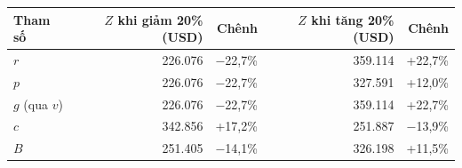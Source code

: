 \begin{tabular}{lrrrr}
\toprule
Tham số & $Z$ khi giảm 20\% (USD) & Chênh & $Z$ khi tăng 20\% (USD) & Chênh \\
\midrule
$r$ & 226.076 & $-$22,7\% & 359.114 & +22,7\% \\
$p$ & 226.076 & $-$22,7\% & 327.591 & +12,0\% \\
$g$ (qua $v$) & 226.076 & $-$22,7\% & 359.114 & +22,7\% \\
$c$ & 342.856 & +17,2\% & 251.887 & $-$13,9\% \\
$B$ & 251.405 & $-$14,1\% & 326.198 & +11,5\% \\
\bottomrule
\end{tabular}
